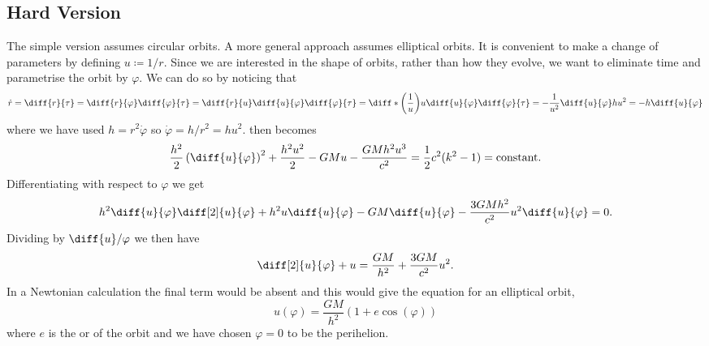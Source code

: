 \documentclass[fleqn]{NotesClass}
\begin{document}
    \subsection{Hard Version}
    The simple version assumes circular orbits.
    A more general approach assumes elliptical orbits.
    It is convenient to make a change of parameters by defining \(u \coloneqq 1/r\).
    Since we are interested in the shape of orbits, rather than how they evolve, we want to eliminate time and parametrise the orbit by \(\varphi\).
    We can do so by noticing that
    \begin{equation}
        \dot{r} = \diff{r}{\tau} = \diff{r}{\varphi}\diff{\varphi}{\tau} = \diff{r}{u}\diff{u}{\varphi}\diff{\varphi}{\tau} = \diff*{\left( \frac{1}{u} \right)}{u}\diff{u}{\varphi}\diff{\varphi}{\tau} = -\frac{1}{u^2}\diff{u}{\varphi}hu^2 = -h\diff{u}{\varphi}
    \end{equation}
    where we have used \(h = r^2\dot{\varphi}\) so \(\dot{\varphi} = h/r^2 = hu^2\).
     then becomes
    \begin{equation}
        \frac{h^2}{2}\left( \diff{u}{\varphi} \right)^2 + \frac{h^2u^2}{2} - GMu - \frac{GMh^2u^3}{c^2} = \frac{1}{2}c^2(k^2 - 1) = \text{constant}.
    \end{equation}
    Differentiating with respect to \(\varphi\) we get
    \begin{equation}
        h^2\diff{u}{\varphi}\diff[2]{u}{\varphi} + h^2u\diff{u}{\varphi} - GM\diff{u}{\varphi} - \frac{3GMh^2}{c^2}u^2\diff{u}{\varphi} = 0.
    \end{equation}
    Dividing by \(\diff{u}/{\varphi}\) we then have
    \begin{equation}
        \diff[2]{u}{\varphi} + u = \frac{GM}{h^2} + \frac{3GM}{c^2}u^2.
    \end{equation}
    In a Newtonian calculation the final term would be absent and this would give the equation for an elliptical orbit,
    \begin{equation}
        u(\varphi) = \frac{GM}{h^2}(1 + e\cos(\varphi))
    \end{equation}
    where \(e\) is the  or  of the orbit and we have chosen \(\varphi = 0\) to be the perihelion.
    
\end{document}
